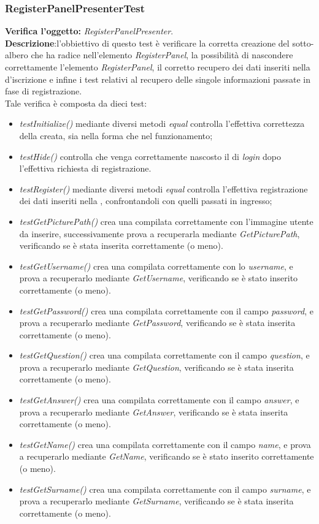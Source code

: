 \subsubsection{RegisterPanelPresenterTest}
\textbf{Verifica l'oggetto:} \textit{RegisterPanelPresenter}.\\
\textbf{Descrizione}:l'obbiettivo di questo test è verificare la corretta creazione del sotto-albero che ha radice nell'elemento \textit{RegisterPanel}, la possibilità di nascondere correttamente l'elemento \textit{RegisterPanel}, il corretto recupero dei dati inseriti nella  d'iscrizione e infine i test relativi al recupero delle singole informazioni passate in fase di registrazione.\\
Tale verifica è composta da dieci test:
\begin{itemize}
\item \textit{testInitialize() } mediante diversi metodi \textit{equal} controlla l'effettiva correttezza della  creata, sia nella forma che nel funzionamento;
\item \textit{testHide() } controlla che venga correttamente nascosto il  di \textit{login} dopo l'effettiva richiesta di registrazione.
\item \textit{testRegister() } mediante diversi metodi \textit{equal} controlla l'effettiva registrazione dei dati inseriti nella , confrontandoli con quelli passati in ingresso;
\item \textit{testGetPicturePath() } crea una  compilata correttamente con l'immagine utente da inserire, successivamente prova a recuperarla mediante \textit{GetPicturePath}, verificando se è stata inserita correttamente (o meno). 
\item \textit{testGetUsername() } crea una  compilata correttamente con lo \textit{username}, e prova a recuperarlo mediante \textit{GetUsername}, verificando se è stato inserito correttamente (o meno).
\item \textit{testGetPassword() } crea una  compilata correttamente con il campo \textit{password}, e prova a recuperarlo mediante \textit{GetPassword}, verificando se è stata inserita correttamente (o meno).
\item \textit{testGetQuestion() }  crea una  compilata correttamente con il campo \textit{question}, e prova a recuperarlo mediante \textit{GetQuestion}, verificando se è stata inserita correttamente (o meno).
\item \textit{testGetAnswer() } crea una  compilata correttamente con il campo \textit{answer}, e prova a recuperarlo mediante \textit{GetAnswer}, verificando se è stata inserita correttamente (o meno).
\item \textit{testGetName() }  crea una  compilata correttamente con il campo \textit{name}, e prova a recuperarlo mediante \textit{GetName}, verificando se è stato inserito correttamente (o meno).
\item \textit{testGetSurname() }  crea una  compilata correttamente con il campo \textit{surname}, e prova a recuperarlo mediante \textit{GetSurname}, verificando se è stata inserita correttamente (o meno).


\end{itemize}
